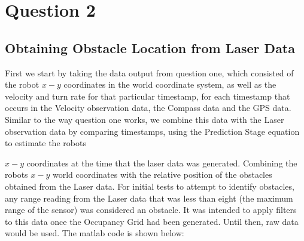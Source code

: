 \pagebreak
\section{Question 2}
	
	\subsection{Obtaining Obstacle Location from Laser Data}
	
	First we start by taking the data output from question one, which consisted of the robot ${x-y}$ coordinates in the world coordinate system, as well as the velocity and turn rate for that particular timestamp, for each timestamp that occurs in the Velocity observation data, the Compass data and the GPS data. \newline Similar to the way question one works, we combine this data with the Laser observation data by comparing timestamps, using the Prediction Stage equation to estimate the robots {${x-y}$ coordinates at the time that the laser data was generated. Combining the robots ${x-y}$ world coordinates with the relative position of the obstacles obtained from the Laser data. \newline
	For initial tests to attempt to identify obstacles, any range reading from the Laser data that was less than eight (the maximum range of the sensor) was considered an obstacle. It was intended to apply filters to this data once the Occupancy Grid had been generated. Until then, raw data would be used.\newline
	\pagebreak
	The matlab code is shown below:
	
		
	
	
}

